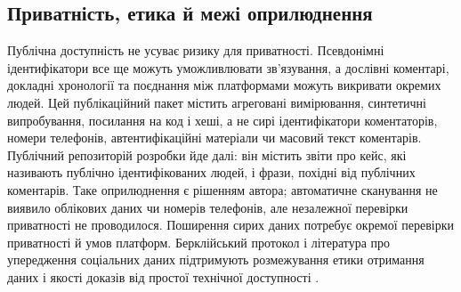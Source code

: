 \subsection{Приватність, етика й межі оприлюднення}
Публічна доступність не усуває ризику для приватності. Псевдонімні ідентифікатори все ще можуть уможливлювати зв'язування, а дослівні коментарі, докладні хронології та поєднання між платформами можуть викривати окремих людей. Цей публікаційний пакет містить агреговані вимірювання, синтетичні випробування, посилання на код і хеші, а не сирі ідентифікатори коментаторів, номери телефонів, автентифікаційні матеріали чи масовий текст коментарів. Публічний репозиторій розробки йде далі: він містить звіти про кейс, які називають публічно ідентифікованих людей, і фрази, похідні від публічних коментарів. Таке оприлюднення є рішенням автора; автоматичне сканування не виявило облікових даних чи номерів телефонів, але незалежної перевірки приватності не проводилося. Поширення сирих даних потребує окремої перевірки приватності й умов платформ. Берклійський протокол і література про упередження соціальних даних підтримують розмежування етики отримання даних і якості доказів від простої технічної доступності \citep{berkeleyProtocol2022,Olteanu2019}.
